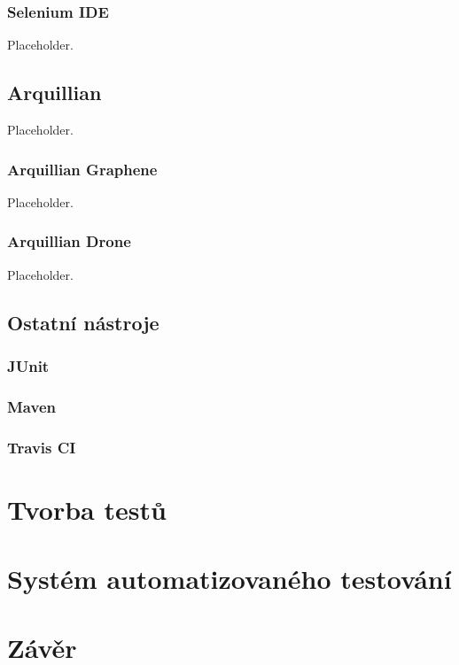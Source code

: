 \documentclass[
    color,   %
	table,   %
    twoside, %
]{fithesis3}
\begin{document}
  \subsection{Selenium IDE}
  Placeholder.
  \section{Arquillian}
    Placeholder.
  \subsection{Arquillian Graphene}
    Placeholder.
  \subsection{Arquillian Drone}
    Placeholder.
  \section{Ostatní nástroje}
   \subsection{JUnit}
  \subsection{Maven}
   \subsection{Travis CI}
  \chapter{Tvorba testů}
  \chapter{Systém automatizovaného testování}
  \chapter{Závěr}
  
\end{document}

